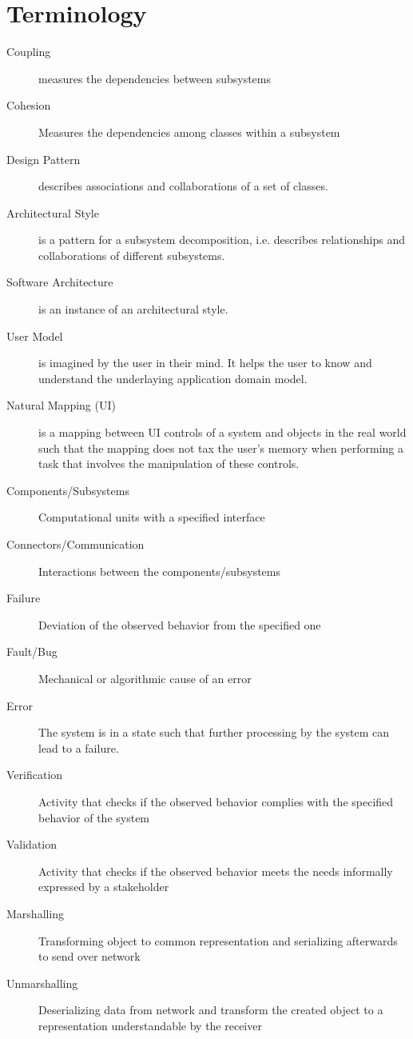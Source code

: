 
\section{Terminology}
\begin{description}
  \item[Coupling] measures the dependencies between subsystems

  \item[Cohesion] Measures the dependencies among classes within a subsystem

  \item[Design Pattern] describes associations and collaborations of a set of classes.

  \item[Architectural Style] is a pattern for a subsystem decomposition, i.e. describes relationships and collaborations of different subsystems.

  \item[Software Architecture] is an instance of an architectural style.

  \item[User Model] is imagined by the user in their mind.
  It helps the user to know and understand the underlaying application domain model.

  \item[Natural Mapping (UI)] is a mapping between UI controls of a system and objects in the real world such that the mapping does not tax the user's memory when performing a task that involves the manipulation of these controls.

  \item[Components/Subsystems] Computational units with a specified interface

  \item[Connectors/Communication] Interactions between the components/subsystems

  \item[Failure] Deviation of the observed behavior from the specified one

  \item[Fault/Bug] Mechanical or algorithmic cause of an error

  \item[Error] The system is in a state such that further processing by the system can lead to a failure.

  \item[Verification] Activity that checks if the observed behavior complies with the specified behavior of the system

  \item[Validation] Activity that checks if the observed behavior meets the needs informally expressed by a stakeholder
  
  \item[Marshalling] Transforming object to common representation and serializing afterwards to send over network
  
  \item[Unmarshalling] Deserializing data from network and transform the created object to a representation understandable by the receiver
  
\end{description}

